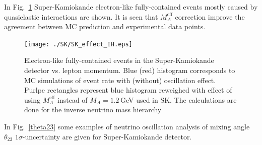 In Fig.~\ref{SKeffect} Super-Kamiokande electron-like fully-contained events mostly caused by quasielastic interactions are shown. It is seen that $M_{A}^{\mathrm{eff}}$ correction improve the agreement between MC prediction and experimental data points.

\begin{figure}[htb!]
\texttt{[image: ./SK/SK\_effect\_IH.eps]}
\caption{\label{SKeffect}Electron-like fully-contained events in the Super-Kamiokande detector vs. lepton momentum. Blue (red) histogram corresponds to MC simulations of event rate with (without) oscillation effect. Purlpe rectangles represent blue histogram reweighed with effect of using $M_{A}^{\mathrm{eff}}$ instead of $M_{A}=1.2$\,GeV used in SK. The calculations are done for the inverse neutrino mass hierarchy}
\end{figure}

In Fig.~\ref{theta23} some examples of neutrino oscillation analysis of mixing angle $\theta_{23}$ $1\sigma$-uncertainty are given for Super-Kamiokande detector.

